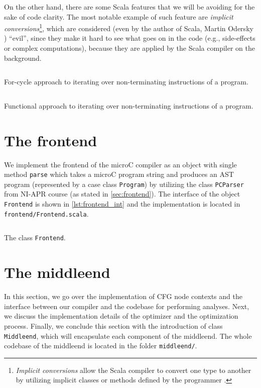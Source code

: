 \documentclass[thesis=M,english]{FITthesis}[2019/12/23]
\begin{document}
On the other hand, there are some Scala features that we will be avoiding for the sake of code clarity. The most notable example of such feature are \emph{implicit conversions}\footnote{\emph{Implicit conversions} allow the Scala compiler to convert one type to another by utilizing implicit classes or methods defined by the programmer \cite[21.1]{scala}.}, which are considered (even by the author of Scala, Martin Odersky \cite{impl_conv}) “evil”, since they make it hard to see what goes on in the code (e.g., side-effects or complex computations), because they are applied by the Scala compiler on the background.

\begin{listing}[H]
	\inputminted[tabsize=2,breaklines,bgcolor=codebg]{scala}{snippets/iter_for.m}
	\caption{For-cycle approach to iterating over non-terminating instructions of a program.}
	\label{lst:iter_for}
\end{listing}

\begin{listing}[H]
	\inputminted[tabsize=2,breaklines,bgcolor=codebg]{scala}{snippets/iter_fun.m}
	\caption{Functional approach to iterating over non-terminating instructions of a program.}
	\label{lst:iter_fun}
\end{listing}


\section{The frontend}
We implement the frontend of the microC compiler as an object with single method \texttt{parse} which takes a microC program string and produces an AST program (represented by a case class \texttt{Program}) by utilizing the class \texttt{PCParser} from NI-APR course (as stated in \autoref{sec:frontend}). The interface of the object \texttt{Frontend} is shown in \autoref{lst:frontend_int} and the implementation is located in \texttt{frontend/Frontend.scala}.

\begin{listing}[H]
	\inputminted[tabsize=2,breaklines,bgcolor=codebg]{scala}{snippets/frontend_interface.m}
	\caption{The class \texttt{Frontend}.}
	\label{lst:frontend_int}
\end{listing}

\section{The middleend}
In this section, we go over the implementation of CFG node contexts and the interface between our compiler and the codebase for performing analyses. Next, we discuss the implementation details of the optimizer and the optimization process. Finally, we conclude this section with the introduction of class \texttt{Middleend}, which will encapsulate each component of the middleend. The whole codebase of the middleend is located in the folder \texttt{middleend/}.
\end{document}

